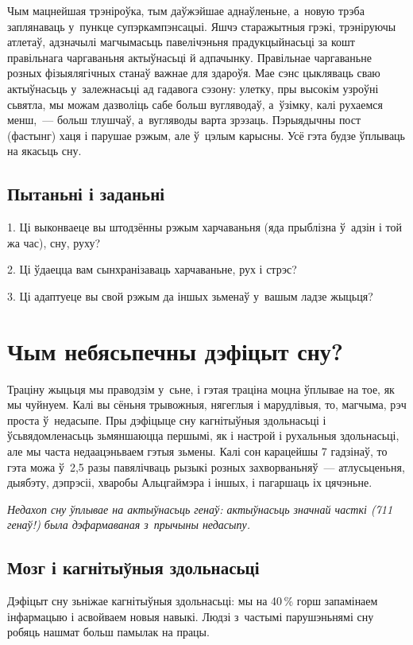 Чым мацнейшая трэніроўка, тым даўжэйшае аднаўленьне, а~новую трэба заплянаваць у~пункце супэркампэнсацыі. Яшчэ старажытныя грэкі, трэніруючы атлетаў, адзначылі магчымасьць павелічэньня прадукцыйнасьці за кошт правільнага чаргаваньня актыўнасьці й адпачынку. Правільнае чаргаваньне розных фізыялягічных станаў важнае для здароўя. Мае сэнс цыкляваць сваю актыўнасьць у~залежнасьці ад гадавога сэзону: улетку, пры высокім узроўні сьвятла, мы можам дазволіць сабе больш вугляводаў, а~ўзімку, калі рухаемся менш,~--- больш тлушчаў, а~вугляводы варта зрэзаць. Пэрыядычны пост (фастынг) хаця і парушае рэжым, але ў~цэлым карысны. Усё гэта будзе ўплываць на якасьць сну.

\subsection*{Пытаньні і заданьні}

1. Ці выконваеце вы штодзённы рэжым харчаваньня (яда прыблізна ў~адзін і той жа час), сну, руху?

2. Ці ўдаецца вам сынхранізаваць харчаваньне, рух і стрэс?

3. Ці адаптуеце вы свой рэжым да іншых зьменаў у~вашым ладзе жыцьця?


\section{Чым небясьпечны дэфіцыт сну?}

Траціну жыцьця мы праводзім у~сьне, і гэтая траціна моцна ўплывае на тое, як мы чуйнуем. Калі вы сёньня трывожныя, нягеглыя і марудлівыя, то, магчыма, рэч проста ў~недасыпе. Пры дэфіцыце сну кагнітыўныя здольнасьці і ўсьвядомленасьць зьмяншаюцца першымі, як і настрой і рухальныя здольнасьці, але мы часта недаацэньваем гэтыя зьмены. Калі сон карацейшы 7 гадзінаў, то гэта можа ў~2,5 разы павялічваць рызыкі розных захворваньняў~--- атлусьценьня, дыябэту, дэпрэсіі, хваробы Альцгаймэра і іншых, і пагаршаць іх цячэньне. 

\emph{Недахоп сну ўплывае на актыўнасьць генаў: актыўнасьць значнай часткі (711 генаў!) была дэфармаваная з~прычыны недасыпу.}

\subsection*{Мозг і кагнітыўныя здольнасьці}

Дэфіцыт сну зьніжае кагнітыўныя здольнасьці: мы на 40\,\% горш запамінаем інфармацыю і асвойваем новыя навыкі. Людзі з~частымі парушэньнямі сну робяць нашмат больш памылак на працы. 

